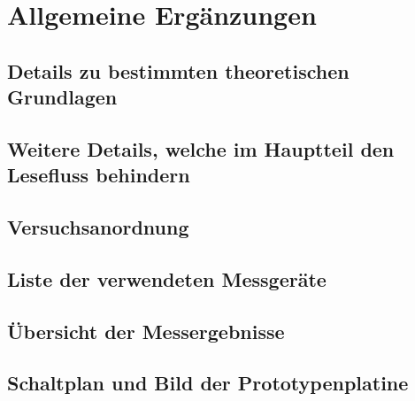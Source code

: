 \chapter{Allgemeine Ergänzungen}

\section{Details zu bestimmten theoretischen Grundlagen}

\section{Weitere Details, welche im Hauptteil den Lesefluss behindern}

\setcounter{chapter}{2}
\setcounter{section}{0}
\setcounter{table}{0}
\setcounter{figure}{0}

\section{Versuchsanordnung}

\section{Liste der verwendeten Messgeräte}

\section{Übersicht der Messergebnisse}

\section{Schaltplan und Bild der Prototypenplatine}

\clearpage
